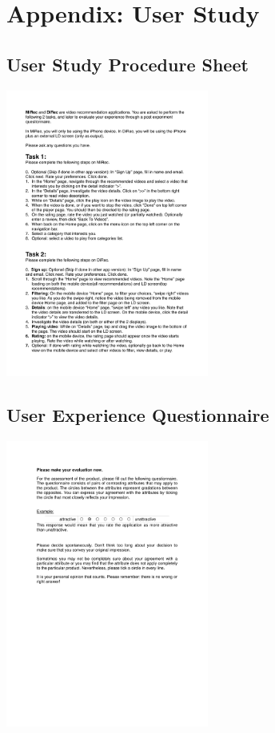 \chapter{Appendix: User Study}\label{chapter:appendB}
\section{User Study Procedure Sheet}
\includegraphics[width=0.5\textwidth, center, center]{figures/Procedure}
\newpage
\section{User Experience Questionnaire}
\includegraphics[width=0.5\textwidth, center, center]{figures/UEQ_English}
